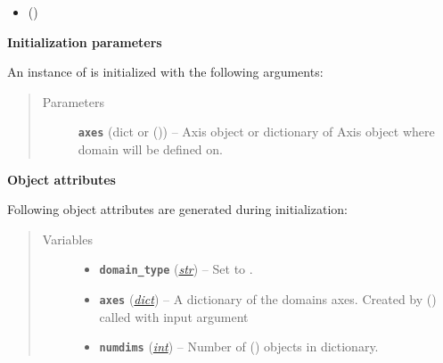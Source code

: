 \documentclass[a4paper,10pt,english]{sphinxmanual}
\begin{document}
\begin{fulllineitems}
\begin{itemize}
\item {} 
{\hyperref[api/climlab.domain:climlab.domain.domain.box_model_domain]{\emph{}}} ()

\end{itemize}

\textbf{Initialization parameters}

An instance of  is initialized with the following 
arguments:
\begin{quote}\begin{description}
\item[{Parameters}] \leavevmode
\textbf{\texttt{axes}} (dict or {\hyperref[api/climlab.domain:climlab.domain.axis.Axis]{\emph{}}} ()) -- Axis object or dictionary of Axis object where domain will
be defined on.

\end{description}\end{quote}

\textbf{Object attributes}

Following object attributes are generated during initialization:
\begin{quote}\begin{description}
\item[{Variables}] \leavevmode\begin{itemize}
\item {} 
\textbf{\texttt{domain\_type}} (\href{http://docs.python.org/2.7/library/functions.html\#str}{\emph{str}}) -- Set to .

\item {} 
\textbf{\texttt{axes}} (\href{http://docs.python.org/2.7/library/stdtypes.html\#dict}{\emph{dict}}) -- A dictionary of the domains axes. Created by
{\hyperref[api/climlab.domain:climlab.domain.domain._Domain._make_axes_dict]{\emph{}}} () called with input 
argument 

\item {} 
\textbf{\texttt{numdims}} (\href{http://docs.python.org/2.7/library/functions.html\#int}{\emph{int}}) -- Number of {\hyperref[api/climlab.domain:climlab.domain.axis.Axis]{\emph{}}} () objects
in  dictionary.


\end{itemize}
\end{description}
\end{quote}
\end{fulllineitems}
\end{document}

